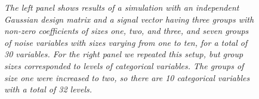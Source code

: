 \documentclass{imsart}
\begin{document}
\begin{figure}
\begin{center}
\hspace{-15pt}
\caption{\small \it The left panel shows results of a simulation with
  an independent Gaussian design matrix and a signal vector having
  three groups with non-zero coefficients of sizes one, two, and
  three, and seven groups of noise variables with sizes varying from
  one to ten, for a total of 30 variables. For the right panel we
  repeated this setup, but group sizes corresponded to levels of
  categorical variables. The groups of size one were increased to two,
so there are 10 categorical variables with a total of 32 levels.}
\end{center}
\end{figure}






\end{document}
